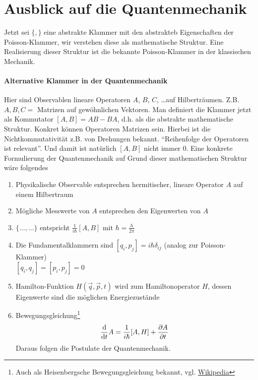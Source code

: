 \newcommand{\fihbar}{\frac{1}{i \hbar}}

\section{Ausblick auf die Quantenmechanik}
Jetzt sei $\{,\}$ eine abstrakte Klammer mit den abstrakteb Eigenschaften der Poisson-Klammer, wir verstehen diese als mathematische Struktur.
Eine Realisierung dieser Struktur ist die bekannte Poisson-Klammer in der klassischen Mechanik.

\paragraph{Alternative Klammer in der Quantenmechanik}
Hier sind Observablen lineare Operatoren $A$, $B$, $C$, \dots auf Hilberträumen. Z.B. $A,B,C = $ Matrizen auf gewöhnlichen Vektoren. Man definiert die Klammer jetzt als Kommutator $[A,B] = AB - BA$, d.h.
als die abstrakte mathematische Struktur. Konkret können Operatoren Matrizen sein. Hierbei ist die Nichtkommutativität z.B. von Drehungen bekannt. "`Reihenfolge der Operatoren ist relevant"'. Und damit ist natürlich $[A, B]$ nicht immer $0$.
Eine konkrete Formulierung der Quantenmechanik auf Grund dieser mathematischen Struktur wäre folgendes
\begin{enumerate}
	\item Physikalische Observable entsprechen hermitischer, lineare Operator $A$ auf einem Hilbertraum
	\item Mögliche Messwerte von $A$ entsprechen den Eigenwerten von $A$
	\item $\{\dots, \dots\}$ entspricht $\fihbar [A, B]$ mit $\hbar = \frac{h}{2 \pi}$
	\item Die Fundamentalklammern sind
	$[q_i, p_j] = i \hbar \delta_{ij}$ (analog zur Poisson-Klammer)\\
	$[q_i, q_j] = [p_i, p_j] = 0$
	\item Hamilton-Funktion $H(\vec{q}, \vec{p}, t)$ wird zum Hamiltonoperator $H$, dessen Eigenwerte sind die möglichen Energiezustände
	\item Bewegungsgleichung\footnote{Auch als Heisenbergsche Bewegungsgleichung bekannt, vgl. \href{https://de.wikipedia.org/wiki/Heisenbergsche_Bewegungsgleichung}{Wikipedia}}
	$$\dd t A = \fihbar [A, H] + \ffpartial{A}{t}$$
	Daraus folgen die Postulate der Quantenmechanik.
\end{enumerate}

